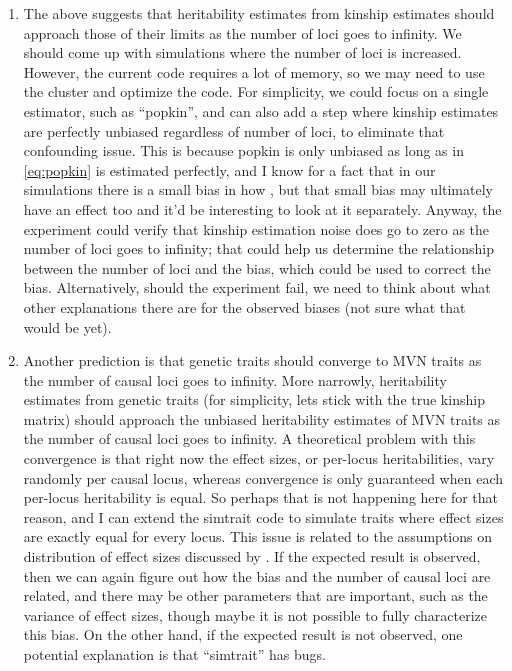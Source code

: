 \documentclass[11pt]{article}
\begin{document}
\begin{enumerate}
\item The above suggests that heritability estimates from kinship estimates should approach those of their limits as the number of loci goes to infinity.
  We should come up with simulations where the number of loci is increased.
  However, the current code requires a lot of memory, so we may need to use the cluster and optimize the code.
  For simplicity, we could focus on a single estimator, such as ``popkin'', and can also add a step where kinship estimates are perfectly unbiased regardless of number of loci, to eliminate that confounding issue.
  This is because popkin is only unbiased as long as \AMinHat in \cref{eq:popkin} is estimated perfectly, and I know for a fact that in our simulations there is a small bias in how \AMinHat, but that small bias may ultimately have an effect too and it'd be interesting to look at it separately.
  Anyway, the experiment could verify that kinship estimation noise does go to zero as the number of loci goes to infinity; that could help us determine the relationship between the number of loci and the bias, which could be used to correct the bias.
  Alternatively, should the experiment fail, we need to think about what other explanations there are for the observed biases (not sure what that would be yet).
\item Another prediction is that genetic traits should converge to MVN traits as the number of causal loci goes to infinity.
  More narrowly, heritability estimates from genetic traits (for simplicity, lets stick with the true kinship matrix) should approach the unbiased heritability estimates of MVN traits as the number of causal loci goes to infinity.
  A theoretical problem with this convergence is that right now the effect sizes, or per-locus heritabilities, vary randomly per causal locus, whereas convergence is only guaranteed when each per-locus heritability is equal.
  So perhaps that is not happening here for that reason, and I can extend the simtrait code to simulate traits where effect sizes are exactly equal for every locus.
  This issue is related to the assumptions on distribution of effect sizes discussed by \citet{speed_improved_2012}.
  If the expected result is observed, then we can again figure out how the bias and the number of causal loci are related, and there may be other parameters that are important, such as the variance of effect sizes, though maybe it is not possible to fully characterize this bias.
  On the other hand, if the expected result is not observed, one potential explanation is that ``simtrait'' has bugs.

\end{enumerate}
\end{document}
